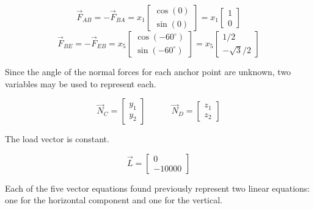 \begin{applicationActivities}
\begin{observation}
\[
\vec F_{AB}=-\vec F_{BA}=x_1\begin{bmatrix}\cos(0)\\\sin(0)\end{bmatrix}
=x_1\begin{bmatrix}1\\0\end{bmatrix}
\]
\[
\vec F_{BE}=-\vec F_{EB}=x_5\begin{bmatrix}\cos(-60^\circ)\\\sin(-60^\circ)\end{bmatrix}
=x_5\begin{bmatrix}1/2\\-\sqrt{3}/2\end{bmatrix}
\]


\end{observation}

\begin{observation}
Since the angle of the normal forces for each anchor point are unknown,
two variables may be used to represent each.

\drawtruss{\trussNormalForces}

\[
\vec N_C=\begin{bmatrix}y_1\\y_2\end{bmatrix}
\hspace{3em}
\vec N_D=\begin{bmatrix}z_1\\z_2\end{bmatrix}
\]

The load vector is constant.

\[
\vec L = \begin{bmatrix}0\\-10000\end{bmatrix}
\]

\end{observation}

\begin{remark}
Each of the five vector
equations found previously represent two linear equations:
one for the horizontal component and one for the vertical.

\drawtruss{\trussStrutVariables}


\end{remark}
\end{applicationActivities}
